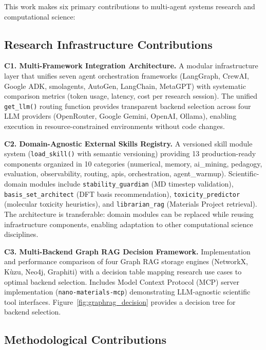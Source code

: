 \documentclass[11pt]{article}
\newcommand{\code}[1]{\texttt{#1}}
\begin{document}
This work makes six primary contributions to multi-agent systems research and computational science:

\subsection{Research Infrastructure Contributions}

\textbf{C1. Multi-Framework Integration Architecture.}
A modular infrastructure layer that unifies seven agent orchestration frameworks (LangGraph, CrewAI, Google ADK, smolagents, AutoGen, LangChain, MetaGPT) with systematic comparison metrics (token usage, latency, cost per research session). The unified \code{get\_llm()} routing function provides transparent backend selection across four LLM providers (OpenRouter, Google Gemini, OpenAI, Ollama), enabling execution in resource-constrained environments without code changes.

\textbf{C2. Domain-Agnostic External Skills Registry.}
A versioned skill module system (\code{load\_skill()} with semantic versioning) providing 13 production-ready components organized in 10 categories (numerical, memory, ai\_mining, pedagogy, evaluation, observability, routing, apis, orchestration, agent\_warmup). Scientific-domain modules include \code{stability\_guardian} (MD timestep validation), \code{basis\_set\_architect} (DFT basis recommendation), \code{toxicity\_predictor} (molecular toxicity heuristics), and \code{librarian\_rag} (Materials Project retrieval). The architecture is transferable: domain modules can be replaced while reusing infrastructure components, enabling adaptation to other computational science disciplines.

\textbf{C3. Multi-Backend Graph RAG Decision Framework.}
Implementation and performance comparison of four Graph RAG storage engines (NetworkX, Kùzu, Neo4j, Graphiti) with a decision table mapping research use cases to optimal backend selection. Includes Model Context Protocol (MCP) server implementation (\code{nano-materials-mcp}) demonstrating LLM-agnostic scientific tool interfaces. Figure~\ref{fig:graphrag_decision} provides a decision tree for backend selection.



\subsection{Methodological Contributions}
\end{document}
